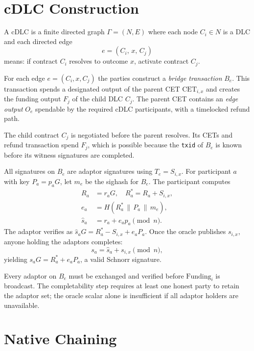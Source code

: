 \documentclass[11pt,a4paper]{article}
\newcommand{\code}[1]{\texttt{#1}}
\theoremstyle{claimstyle}
\begin{document}
\section{cDLC Construction}

A cDLC is a finite directed graph $\Gamma = (N, E)$ where each node $C_i \in N$
is a DLC and each directed edge
\[
  e = (C_i,\, x,\, C_j)
\]
means: if contract $C_i$ resolves to outcome $x$, activate contract $C_j$.

For each edge $e = (C_i, x, C_j)$ the parties construct a \emph{bridge
transaction} $B_e$. This transaction spends a designated output of the parent
CET $\mathrm{CET}_{i,x}$ and creates the funding output $F_j$ of the child DLC
$C_j$. The parent CET contains an \emph{edge output} $O_e$ spendable by the
required cDLC participants, with a timelocked refund path.

The child contract $C_j$ is negotiated before the parent resolves. Its CETs and
refund transaction spend $F_j$, which is possible because the \code{txid} of
$B_e$ is known before its witness signatures are completed.

All signatures on $B_e$ are adaptor signatures using $T_e = S_{i,x}$.
For participant $a$ with key $P_a = p_a G$, let $m_e$ be the sighash for $B_e$.
The participant computes
\begin{align*}
  R_a   &= r_a G,\quad R^*_a = R_a + S_{i,x},\\
  e_a   &= H(R^*_a \,\|\, P_a \,\|\, m_e),\\
  \hat{s}_a &= r_a + e_a p_a \pmod{n}.
\end{align*}
The adaptor verifies as $\hat{s}_a G = R^*_a - S_{i,x} + e_a P_a$.
Once the oracle publishes $s_{i,x}$, anyone holding the adaptors completes:
\[
  s_a = \hat{s}_a + s_{i,x} \pmod{n},
\]
yielding $s_a G = R^*_a + e_a P_a$, a valid Schnorr signature.

Every adaptor on $B_e$ must be exchanged and verified before
$\mathrm{Funding}_i$ is broadcast. The completability step requires at least one
honest party to retain the adaptor set; the oracle scalar alone is insufficient
if all adaptor holders are unavailable.

\section{Native Chaining}
\end{document}
